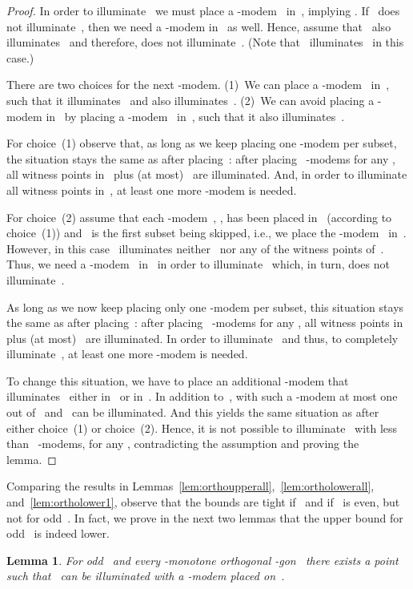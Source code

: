 \documentclass[A4]{article}
\newtheorem{lemma}[theorem]{Lemma}
\begin{document}
\begin{proof}
In order to illuminate~ we must place a \mbox{-modem}~ in~, implying .
If~ does not illuminate~, then we need a \mbox{-modem} in~ as well. 
Hence, assume that~ also illuminates~ and therefore, does not illuminate~.
(Note that~ illuminates~ in this case.)

There are two choices for the next \mbox{-modem}.
(1)~We can place a \mbox{-modem}~ in~, such that it illuminates~ and also illuminates~.
(2)~We can avoid placing a \mbox{-modem} in~ by placing a \mbox{-modem}~ in~, such that it also illuminates~.

For choice~(1) observe that, as long as we keep placing one \mbox{-modem} per subset, the situation stays the same as after placing~:
after placing~ \mbox{-modems} for any , all witness points in~ plus (at most)~ are illuminated.
And, in order to illuminate all witness points in~, at least one more \mbox{-modem} is needed.

For choice~(2) assume that each \mbox{-modem}~, , has been placed in~ (according to choice~(1)) and~ is the first subset being skipped, i.e., we place the \mbox{-modem}~ in~.
However, in this case~ illuminates neither~ nor any of the witness points of~.
Thus, we need a \mbox{-modem}~ in~ in order to illuminate~ which, in turn, does not illuminate~.

As long as we now keep placing only one \mbox{-modem} per subset, this situation stays the same as after placing~:
after placing~\mbox{} \mbox{-modems} for any , all witness points in~ plus (at most)~ are illuminated.
In order to illuminate~ and thus, to completely illuminate~, at least one more \mbox{-modem} is needed.

To change this situation, we have to place an additional \mbox{-modem} that illuminates~ either in~ or in~.
In addition to~, with such a \mbox{-modem} at most one out of~ and~ can be illuminated.
And this yields the same situation as after either choice~(1) or choice~(2).
Hence, it is not possible to illuminate~ with less than~ \mbox{-modems}, for any , contradicting the assumption and proving the lemma.
\end{proof}


Comparing the results in Lemmas~\ref{lem:orthoupperall},~\ref{lem:ortholowerall}, and~\ref{lem:ortholower1}, observe that the bounds are tight if~ and if~ is even, but not for odd~.
In fact, we prove in the next two lemmas that the upper bound for odd~ is indeed lower.


\begin{lemma}\label{lem:2k+8}
For odd~ and every -monotone orthogonal -gon~ there exists a point  such that~ can be illuminated with a \mbox{-modem} placed on~.
\end{lemma}
\end{document}
